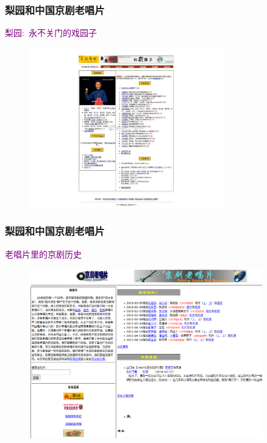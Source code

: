 \documentclass[cjk,slidestop,compress,mathserif,blue]{beamer}
\begin{document}
\frame
{
	\frametitle{梨园和中国京剧老唱片}
	\textcolor{purple}{梨园:~永不关门的戏园子}
\begin{figure}[h!]
\centering
\vspace{-0.05in}
\includegraphics[height=0.65\textwidth,width=0.75\textwidth,clip]{Figures_Peking-Opera/PekOpe_Liyuan.jpg}
\label{Liyuan}
\end{figure}
}

\frame
{
	\frametitle{梨园和中国京剧老唱片}
	\textcolor{purple}{老唱片里的京剧历史}
\begin{figure}[h!]
\centering
\vspace{-0.05in}
\includegraphics[height=0.65\textwidth,width=0.90\textwidth,clip]{Figures_Peking-Opera/PekOpe_Oldrec.png}
\label{Oldrecord}
\end{figure}
}
\end{document}
